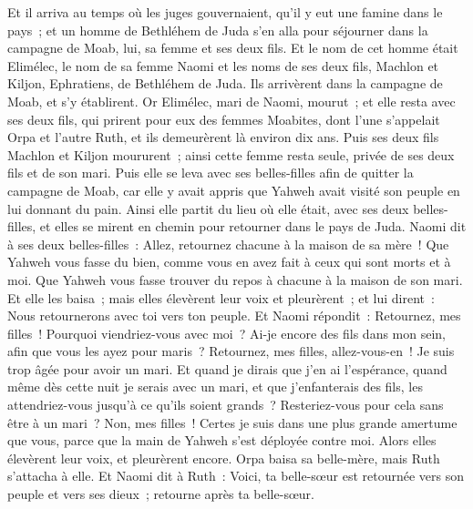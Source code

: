 \begin{multicols}{2}
\VerseOne{}Et il arriva au temps où les juges gouvernaient, qu'il y eut une famine dans le pays~; et un homme de Bethléhem de Juda s'en alla pour séjourner dans la campagne de Moab, lui, sa femme et ses deux fils.
Et le nom de cet homme était Elimélec, le nom de sa femme Naomi et les noms de ses deux fils, Machlon et Kiljon, Ephratiens, de Bethléhem de Juda. Ils arrivèrent dans la campagne de Moab, et s'y établirent.
Or Elimélec, mari de Naomi, mourut~; et elle resta avec ses deux fils,
qui prirent pour eux des femmes Moabites, dont l'une s'appelait Orpa et l'autre Ruth, et ils demeurèrent là environ dix ans.
Puis ses deux fils Machlon et Kiljon moururent~; ainsi cette femme resta seule, privée de ses deux fils et de son mari.
Puis elle se leva avec ses belles-filles afin de quitter la campagne de Moab, car elle y avait appris que Yahweh avait visité son peuple en lui donnant du pain.
Ainsi elle partit du lieu où elle était, avec ses deux belles-filles, et elles se mirent en chemin pour retourner dans le pays de Juda.
Naomi dit à ses deux belles-filles~: Allez, retournez chacune à la maison de sa mère~! Que Yahweh vous fasse du bien, comme vous en avez fait à ceux qui sont morts et à moi.
Que Yahweh vous fasse trouver du repos à chacune à la maison de son mari. Et elle les baisa~; mais elles élevèrent leur voix et pleurèrent~;
et lui dirent~: Nous retournerons avec toi vers ton peuple.
Et Naomi répondit~: Retournez, mes filles~! Pourquoi viendriez-vous avec moi~? Ai-je encore des fils dans mon sein, afin que vous les ayez pour maris~?
Retournez, mes filles, allez-vous-en~! Je suis trop âgée pour avoir un mari. Et quand je dirais que j'en ai l'espérance, quand même dès cette nuit je serais avec un mari, et que j'enfanterais des fils,
les attendriez-vous jusqu'à ce qu'ils soient grands~? Resteriez-vous pour cela sans être à un mari~? Non, mes filles~! Certes je suis dans une plus grande amertume que vous, parce que la main de Yahweh s'est déployée contre moi.
Alors elles élevèrent leur voix, et pleurèrent encore. Orpa baisa sa belle-mère, mais Ruth s'attacha à elle.
Et Naomi dit à Ruth~: Voici, ta belle-sœur est retournée vers son peuple et vers ses dieux~; retourne après ta belle-sœur.

\end{multicols}
